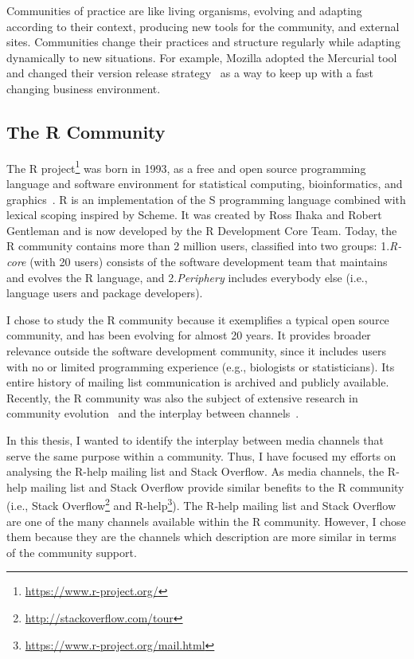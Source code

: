 \documentclass{sig-alternate-05-2015}
\begin{document}
	Communities of practice are like living organisms, evolving and adapting according to their context, producing new tools for the community, and external sites.
	Communities change their practices and structure regularly while adapting dynamically to new situations.
	For example, Mozilla adopted the Mercurial tool~\cite{Rodriguez-Bustos2012} and changed their version release strategy~\cite{Khomh2012} as a way to keep up with a fast changing business environment.

\subsection{The R Community}

	The R project\footnote{\url{https://www.r-project.org/}} was born in 1993, as a free and open source programming language and software environment for statistical computing, bioinformatics, and graphics~\cite{Ihaka1996}. 
	R is an implementation of the S programming language combined with lexical scoping inspired by Scheme. 
	It was created by Ross Ihaka and Robert Gentleman and is now developed by the R Development Core Team.
	Today, the R community contains more than 2 million users, classified into two groups: 1.\textit{R-core} (with 20 users) consists of the software development team that maintains and evolves the R language, and 2.\textit{Periphery} includes everybody else (i.e., language users and package developers).

	I chose to study the R community because it exemplifies a typical open source community, and has been evolving for almost 20 years. 
	It provides broader relevance outside the software development community, since it includes users with no or limited programming experience (e.g., biologists or statisticians). 
	Its entire history of mailing list communication is archived and publicly available.
	Recently, the R community was also the subject of extensive research in community evolution~\cite{German2013} and the interplay between channels~\cite{Vasilescu2014c}. 

	In this thesis, I wanted to identify the interplay between media channels that serve the same purpose within a community. 
	Thus, I have focused my efforts on analysing the R-help mailing list and Stack Overflow.
	As media channels, the R-help mailing list and Stack Overflow provide similar benefits to the R community (i.e., Stack Overflow\footnote{\url{http://stackoverflow.com/tour}} and R-help\footnote{\url{https://www.r-project.org/mail.html}}).
	The R-help mailing list and Stack Overflow are one of the many channels available within the R community.
	However, I chose them because they are the channels which description are more similar in terms of the community support.
\end{document}
